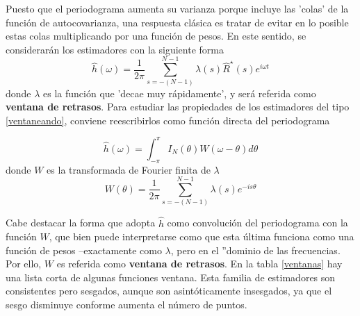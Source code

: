 \documentclass[12pt,a4paper]{mitthesis}
\newcommand{\intPI}{\int_{-\pi}^{\pi}}
\newcommand{\aste}[1]{\widehat{ #1 }^{\star}}
\newcommand{\est}[1]{\widehat{ #1 }}
\begin{document}
Puesto que el periodograma aumenta su varianza porque incluye las 'colas' de la funci\'on de
autocovarianza, una respuesta cl\'asica es tratar de evitar en lo posible estas colas multiplicando 
por una funci\'on de pesos. En este sentido, se considerar\'an los estimadores con la siguiente 
forma
\begin{equation}
\est{h}(\omega) = \frac{1}{2\pi} \sum_{s = -(N-1)}^{N-1} 
\lambda(s) \aste{R}(s) e^{i \omega t}
\label{ventaneando}
\end{equation}
donde $\lambda$ es la funci\'on que 'decae muy r\'apidamente', y ser\'a referida como 
\textbf{ventana de retrasos}. Para estudiar las propiedades de los estimadores del tipo 
\ref{ventaneando}, conviene reescribirlos como funci\'on directa del periodograma

\begin{equation*}
\est{h}(\omega) = \intPI I_N(\theta) W(\omega-\theta) d\theta
\end{equation*}
donde $W$ es la transformada de Fourier finita de $\lambda$
\begin{equation*}
W(\theta) = \frac{1}{2\pi} \sum_{s = -(N-1)}^{N-1} \lambda(s) e^{-is\theta}
\end{equation*}

Cabe destacar la forma que adopta $\est{h}$ como convoluci\'on del periodograma con la funci\'on
$W$, que bien puede interpretarse como que esta \'ultima funciona como una funci\'on de pesos
--exactamente como $\lambda$, pero en el ''dominio de las frecuencias. Por ello, $W$ es referida 
como \textbf{ventana de retrasos}.
En la tabla \ref{ventanas} hay una lista corta de algunas funciones ventana.
Esta familia de estimadores son consistentes pero sesgados, aunque son asint\'oticamente 
insesgados, ya que el sesgo disminuye conforme aumenta el n\'umero de puntos.
\end{document}
